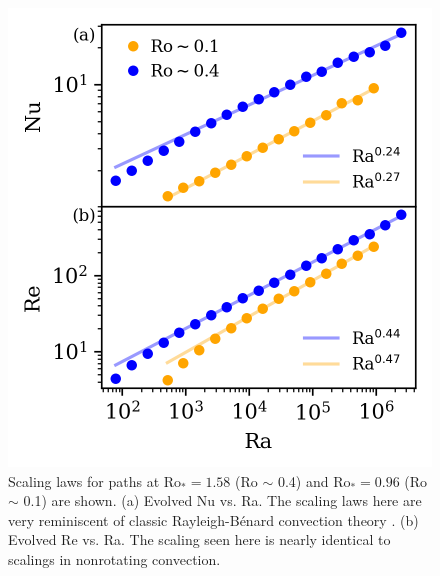 \documentclass[twocolumn, amsmath, amsfonts, amssymb]{aastex62}
\newcommand{\RB}{Rayleigh-B\'{e}nard }
\newcommand{\pro}{\ensuremath{\text{Ro}_{\text{*}}}}
\begin{document}
\begin{figure}[t!]
    \includegraphics{./figs/nu_and_re.png}
    \caption{Scaling laws for paths at $\pro = 1.58$ (Ro $\sim$ 0.4) and
    $\pro = 0.96$ (Ro $\sim$ 0.1) are shown. 
    (a) Evolved Nu vs. Ra. The scaling laws here are very reminiscent of classic \RB convection
    theory \citep{ahlers&all2009}.
    (b) Evolved Re vs. Ra.
    The scaling seen here is nearly identical to scalings in nonrotating convection.
    \label{fig:nu_and_re} }
\end{figure}
\end{document}
